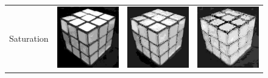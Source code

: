 \begin{figure}
\begin{tabular}{rccc}
         Saturation &
         \includegraphics[width=\rubiklength]{img/rubik/1_hsv_s.jpg} & 
         \includegraphics[width=\rubiklength]{img/rubik/2_hsv_s.jpg} & \includegraphics[width=\rubiklength]{img/rubik/3_hsv_s.jpg}\\
         

\end{tabular}
\end{figure}
